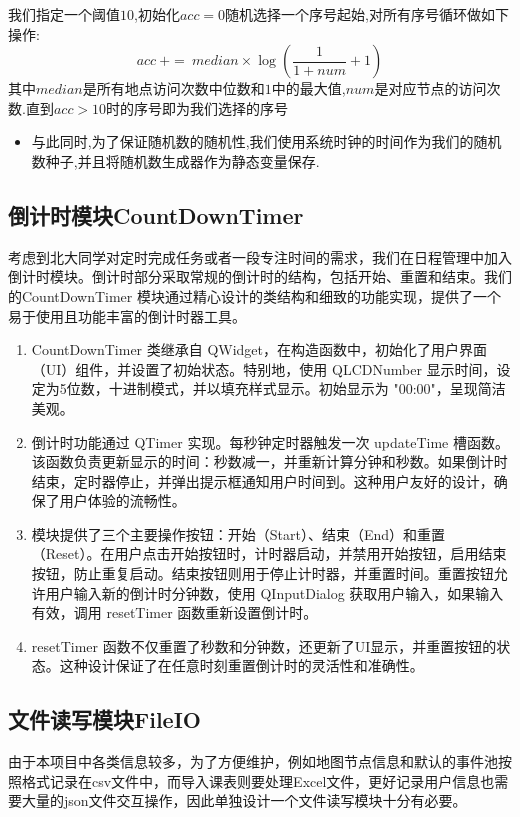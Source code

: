 \documentclass[11pt,hyperref,a4paper,UTF8]{ctexart}
\newcommand{\parameter}[1]{\left(#1\right)}
\begin{document}
\begin{CJK}{UTF8}{gkai}
\begin{enumerate}
    我们指定一个阈值$10$,初始化$acc = 0$随机选择一个序号起始,对所有序号循环做如下操作:
    \[acc~ += ~median \times \log\parameter{\frac{1}{1 + num} + 1}\]
    其中$median$是所有地点访问次数中位数和$1$中的最大值,$num$是对应节点的访问次数.直到$acc > 10$时的序号即为我们选择的序号
\end{enumerate}

\begin{itemize}
    \item 与此同时,为了保证随机数的随机性,我们使用系统时钟的时间作为我们的随机数种子,并且将随机数生成器作为静态变量保存.
\end{itemize}
\subsection{倒计时模块CountDownTimer}
考虑到北大同学对定时完成任务或者一段专注时间的需求，我们在日程管理中加入倒计时模块。倒计时部分采取常规的倒计时的结构，包括开始、重置和结束。我们的CountDownTimer 模块通过精心设计的类结构和细致的功能实现，提供了一个易于使用且功能丰富的倒计时器工具。
\begin{enumerate}
    \item CountDownTimer 类继承自 QWidget，在构造函数中，初始化了用户界面（UI）组件，并设置了初始状态。特别地，使用 QLCDNumber 显示时间，设定为5位数，十进制模式，并以填充样式显示。初始显示为 "00:00"，呈现简洁美观。
    \item 倒计时功能通过 QTimer 实现。每秒钟定时器触发一次 updateTime 槽函数。该函数负责更新显示的时间：秒数减一，并重新计算分钟和秒数。如果倒计时结束，定时器停止，并弹出提示框通知用户时间到。这种用户友好的设计，确保了用户体验的流畅性。
    \item 模块提供了三个主要操作按钮：开始（Start）、结束（End）和重置（Reset）。在用户点击开始按钮时，计时器启动，并禁用开始按钮，启用结束按钮，防止重复启动。结束按钮则用于停止计时器，并重置时间。重置按钮允许用户输入新的倒计时分钟数，使用 QInputDialog 获取用户输入，如果输入有效，调用 resetTimer 函数重新设置倒计时。
    \item resetTimer 函数不仅重置了秒数和分钟数，还更新了UI显示，并重置按钮的状态。这种设计保证了在任意时刻重置倒计时的灵活性和准确性。
\end{enumerate}

\subsection{文件读写模块FileIO}
由于本项目中各类信息较多，为了方便维护，例如地图节点信息和默认的事件池按照格式记录在csv文件中，而导入课表则要处理Excel文件，更好记录用户信息也需要大量的json文件交互操作，因此单独设计一个文件读写模块十分有必要。


\end{CJK}
\end{document}
